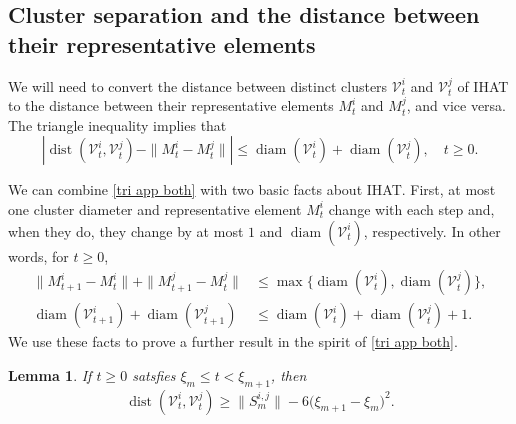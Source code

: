 \documentclass[11pt,reqno]{amsart}
\newtheorem{lemma}{Lemma}[section]
\theoremstyle{definition}
\numberwithin{equation}{section}
\newcommand{\1}{\mathbf{1}}
\DeclareMathOperator{\dist}{dist}
\DeclareMathOperator{\diam}{diam}
\newcommand{\VV}{\mathcal{V}}
\begin{document}
\subsection{Cluster separation and the distance between their representative elements}\label{sec sep to dist}

We will need to convert the distance between distinct clusters $\VV_t^i$ and $\VV_t^j$ of IHAT to the distance between their representative elements $M_t^i$ and $M_t^j$, and vice versa. The triangle inequality implies that
\begin{equation}\label{tri app both}
\left| \dist (\VV_t^i, \VV_t^j) - \| M_t^i - M_t^j\| \right| \leq \diam (\VV_t^i) + \diam (\VV_t^j), \quad t \geq 0.
\end{equation}


We can combine \eqref{tri app both} with two basic facts about IHAT. First, at most one cluster diameter and representative element $M_t^i$ change with each step and, when they do, they change by at most $1$ and $\diam (\VV_t^i)$, respectively. In other words, for $t \geq 0$,
\begin{align}
\|M_{t+1}^i - M_t^i\| + \|M_{t+1}^j - M_t^j\| &\leq \max \{ \diam (\VV_t^i), \diam (\VV_t^j) \}, \label{sep by one}\\
\diam (\VV_{t+1}^i) + \diam (\VV_{t+1}^j) &\leq \diam (\VV_t^i) + \diam (\VV_t^j) + 1. \label{diam by one}
\end{align}
We use these facts to prove a further result in the spirit of \eqref{tri app both}.


\begin{lemma}\label{amlg2}
If $t \geq 0$ satsfies $\xi_m \leq t < \xi_{m+1}$, then
\begin{equation}\label{eq amlg2}
\dist (\VV_t^i, \VV_t^j) \geq \big\| S_m^{i,j} \big\| - 6 \big( \xi_{m+1} - \xi_m \big)^2.
\end{equation}
\end{lemma}
\end{document}
